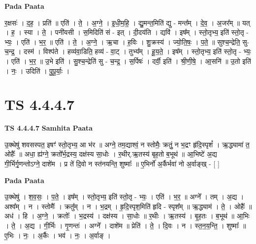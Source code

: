 \documentclass[17pt]{extarticle}
\begin{document}
\textbf{Pada Paata} \newline

र॒क्षसः॑ । द॒ह॒ । प्रति॑ ॥ एति॑ । ते॒ । अ॒ग्ने॒ । इ॒धी॒म॒हि॒ । द्यु॒मन्त॒मिति॑ द्यु - मन्त᳚म् । दे॒व॒ । अ॒जर᳚म् ॥ यत् । ह॒ । स्या । ते॒ । पनी॑यसी । स॒मिदिति॑ सं - इत् । दी॒दय॑ति । द्यवि॑ । इष᳚म् । स्तो॒तृभ्य॒ इति॑ स्तो॒तृ - भ्यः॒ । एति॑ । भ॒र॒ ॥ एति॑ । ते॒ । अ॒ग्ने॒ । ऋ॒चा । ह॒विः । शु॒क्रस्य॑ । ज्यो॒ति॒षः॒ । प॒ते॒ ॥ सुश्च॒न्द्रेति॒ सु-च॒न्द्र॒ । दस्म॑ । विश्प॑ते । हव्य॑वा॒डिति॒ हव्य॑ - वा॒ट् । तुभ्य᳚म् । हू॒य॒ते॒ । इष᳚म् । स्तो॒तृभ्य॒ इति॑ स्तो॒तृ - भ्यः॒ । एति॑ । भ॒र॒ ॥ उ॒भे इति॑ । सु॒श्च॒न्द्रेति॑ सु - च॒न्द्र॒ । स॒र्पिषः॑ । दर्वी॒ इति॑ । श्री॒णी॒षे॒ । आ॒सनि॑ ॥ उ॒तो इति॑ । नः॒ । उदिति॑ । पु॒पू॒र्याः॒ ।  \newline





\section{ TS 4.4.4.7 }

\textbf{TS 4.4.4.7 } \newline
\textbf{Samhita Paata} \newline

उ॒क्थेषु॑ शवसस्पत॒ इषꣳ॑ स्तो॒तृभ्य॒ आ भ॑र ॥ अग्ने॒ तम॒द्याश्वं॒ न स्तोमैः॒ क्रतुं॒ न भ॒द्रꣳ हृ॑दि॒स्पृशं᳚ । ऋ॒द्ध्यामा॑ त॒ ओहैः᳚ ॥ अधा॒ ह्य॑ग्ने॒ क्रतो᳚र्भ॒द्रस्य॒ दक्ष॑स्य सा॒धोः । र॒थीर्.ऋ॒तस्य॑ बृह॒तो ब॒भूथ॑ ॥ आ॒भिष्टे॑ अ॒द्य गी॒र्भिर्गृ॒णन्तोऽग्ने॒ दाशे॑म । प्र ते॑ दि॒वो न स्त॑नयन्ति॒ शुष्माः᳚ ॥ ए॒भिर्नो॑ अ॒र्कैर्भवा॑ नो अ॒र्वाङ्ख् - [  ] \newline

\textbf{Pada Paata} \newline

उ॒क्थेषु॑ । श॒व॒सः॒ । प॒ते॒ । इष᳚म् । स्तो॒तृभ्य॒ इति॑ स्तो॒तृ - भ्यः॒ । एति॑ । भ॒र॒ ॥ अग्ने᳚ । तम् । अ॒द्य । अश्व᳚म् । न । स्तोमैः᳚ । क्रतु᳚म् । न । भ॒द्रम् । हृ॒दि॒स्पृश॒मिति॑ हृदि - स्पृश᳚म् ॥ ऋ॒द्ध्याम॑ । ते॒ । ओहैः᳚ ॥ अध॑ । हि । अ॒ग्ने॒ । क्रतोः᳚ । भ॒द्रस्य॑ । दक्ष॑स्य । सा॒धोः ॥ र॒थीः । ऋ॒तस्य॑ । बृ॒ह॒तः । ब॒भूथ॑ ॥ आ॒भिः । ते॒ । अ॒द्य । गी॒र्भिः । गृ॒णन्तः॑ । अग्ने᳚ । दाशे॑म ॥ प्रेति॑ । ते॒ । दि॒वः । न । स्त॒न॒य॒न्ति॒ । शुष्माः᳚ ॥ ए॒भिः । नः॒ । अ॒र्कैः । भव॑ । नः॒ । अ॒र्वाङ् ।  \newline




\end{document}
